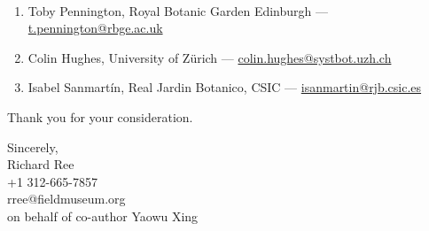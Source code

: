 \documentclass[12pt]{letter}
\begin{document}
\begin{letter}{ \\

}
\begin{enumerate}
\item Toby Pennington, Royal Botanic Garden Edinburgh ---
  \href{mailto:t.pennington@rbge.ac.uk}{t.pennington@rbge.ac.uk}

\item Colin Hughes, University of Zürich ---
  \href{mailto:colin.hughes@systbot.uzh.ch}{colin.hughes@systbot.uzh.ch}

\item Isabel Sanmartín, Real Jardin Botanico, CSIC ---
  \href{mailto:isanmartin@rjb.csic.es}{isanmartin@rjb.csic.es}

\end{enumerate}

Thank you for your consideration.


\closing{Sincerely,\\
  \bigskip
  Richard Ree\\
  +1 312-665-7857\\
  rree@fieldmuseum.org\\
  \medskip on behalf of co-author Yaowu Xing
  }


\end{letter}
\end{document}

